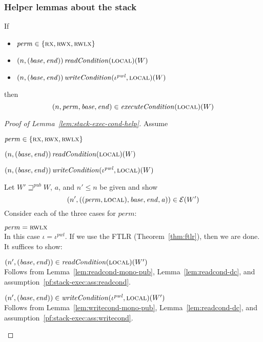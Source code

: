 \documentclass[a4paper]{article}
\newcommand{\var}[1]{\mathit{#1}}
\newcommand{\addr}{\var{a}}
\newcommand{\start}{\var{base}}
\newcommand{\addrend}{\var{end}}
\newcommand{\perm}{\var{perm}}
\newcommand{\pwl}{\var{pwl}}
\newcommand{\plainfun}[2]{
  \ifthenelse{\equal{#2}{}}
  {\mathit{#1}}
  {\mathit{#1}(#2)}
}
\newcommand{\readCond}[1]{\plainfun{readCondition}{#1}}
\newcommand{\writeCond}[1]{\plainfun{writeCondition}{#1}}
\newcommand{\execCond}[1]{\plainfun{executeCondition}{#1}}
\newcommand{\futurewk}{\mathbin{\sqsupseteq}^{\var{pub}}}
\newcommand{\asmType}{\plaindom{AsmType}}
\newcommand{\plaindom}[1]{\mathrm{#1}}
\newcommand{\intr}[2]{\mathcal{#1}}
\newcommand{\exprintr}[1]{\intr{E}{#1}}
\newcommand{\stder}{\exprintr{\asmType}}
\newcommand{\npair}[2][n]{\left(#1,#2 \right)}
\newcommand{\plainperm}[1]{\textsc{#1}}
\newcommand{\exec}{\plainperm{rx}}
\newcommand{\rwx}{\plainperm{rwx}}
\newcommand{\rwlx}{\plainperm{rwlx}}
\newcommand{\local}{\plainperm{local}}
\begin{document}
\subsubsection{Helper lemmas about the stack}
\begin{lemma}
  \label{lem:stack-exec-cond-help}
  If
  \begin{itemize}
  \item $\perm \in \{\exec,\rwx,\rwlx \}$
  \item $\npair{(\start,\addrend)} \readCond{}(\local)(W)$
  \item $\npair{(\start,\addrend)} \writeCond{}(\iota^\pwl,\local)(W)$
  \end{itemize}
  then
  \[
    \npair[n]{\perm,\start,\addrend} \in \execCond{}(\local)(W)
  \]
\end{lemma}
\begin{proof}[Proof of Lemma~\ref{lem:stack-exec-cond-help}]
Assume
\begin{enumproof}
\item $\perm \in \{\exec,\rwx,\rwlx \}$
\item $\npair{(\start,\addrend)} \readCond{}(\local)(W)$ \label{pf:stack-exec:ass:readcond}
\item $\npair{(\start,\addrend)} \writeCond{}(\iota^\pwl,\local)(W)$ \label{pf:stack-exec:ass:writecond}
\end{enumproof}
Let $W' \futurewk W$, $\addr$, and $n' \leq n$ be given and show
\[
  \npair[n']{((\perm,\local),\start,\addrend,\addr)} \in \stder(W')
\]
Consider each of the three cases for $\perm$:
\begin{enumproof}[resume]
  \item $\perm = \rwlx$\\
    In this case $\iota= \iota^\pwl$. If we use the FTLR (Theorem~\ref{thm:ftlr}), then we are done. It suffices to show:
    \begin{enumproof}
      \item $\npair[n']{(\start,\addrend)} \in \readCond{}(\local)(W')$ \\
        Follows from Lemma~\ref{lem:readcond-mono-pub}, Lemma~\ref{lem:readcond-dc}, and assumption~\ref{pf:stack-exec:ass:readcond}.
      \item $\npair[n']{(\start,\addrend)} \in \writeCond{}(\iota^\pwl,\local)(W')$\\
        Follows from Lemma~\ref{lem:writecond-mono-pub}, Lemma~\ref{lem:readcond-dc}, and assumption~\ref{pf:stack-exec:ass:writecond}.
    \end{enumproof}

\end{enumproof}
\end{proof}
\end{document}
